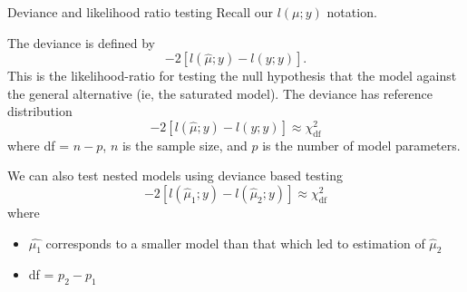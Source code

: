 \documentclass[
  ignorenonframetext,
]{beamer}
\providecommand{\tightlist}{%
  \setlength{\itemsep}{0pt}\setlength{\parskip}{0pt}}
\begin{document}
\begin{frame}{Deviance and likelihood ratio testing}
\protect\hypertarget{deviance-and-likelihood-ratio-testing}{}
Recall our \(l(\mu;y)\) notation.

\vspace{12pt}

The deviance is defined by \[
 -2\left[l(\hat\mu;y) - l(y;y)\right].
\] This is the likelihood-ratio for testing the null hypothesis that the
model against the general alternative (ie, the saturated model). The
deviance has reference distribution \[
  -2\left[l(\hat\mu;y) - l(y;y)\right] \approx \chi^2_{\text{df}}
\] where df = \(n - p\), \(n\) is the sample size, and \(p\) is the
number of model parameters.
\end{frame}

\begin{frame}{}
\protect\hypertarget{section-12}{}
We can also test nested models using deviance based testing \[
  -2\left[l(\hat\mu_1;y) - l(\hat\mu_2;y)\right] \approx \chi^2_{\text{df}}
\] where

\begin{itemize}
\tightlist
\item
  \(\hat{\mu_1}\) corresponds to a smaller model than that which led to
  estimation of \(\hat{\mu}_2\)
\item
  df = \(p_2 - p_1\)
\end{itemize}
\end{frame}
\end{document}
